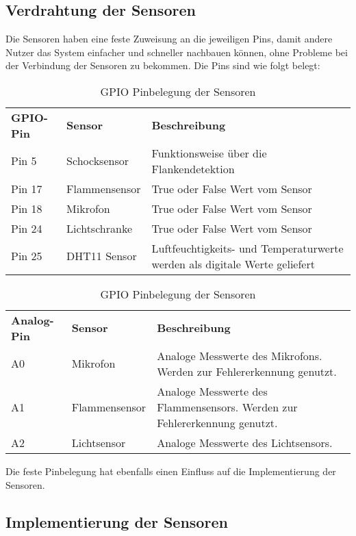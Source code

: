 \subsection{Verdrahtung der Sensoren}
Die Sensoren haben eine feste Zuweisung an die jeweiligen Pins, damit andere Nutzer das System einfacher und schneller nachbauen können, ohne Probleme bei der Verbindung der Sensoren zu bekommen. Die Pins sind wie folgt belegt:
\begin{table}[h]
	\caption{GPIO Pinbelegung der Sensoren}
	\label{tab:GPIO-Pinbelegung}
	\begin{tabular}{p{} p{} p{}}
		\textbf{GPIO-Pin}	& \textbf{Sensor} & \textbf{Beschreibung} \\
		Pin 5 		& Schocksensor 	& Funktionsweise über die Flankendetektion\\	
		Pin 17		& Flammensensor	& True oder False Wert vom Sensor\\
		Pin 18		& Mikrofon		& True oder False Wert vom Sensor\\
		Pin 24		& Lichtschranke	& True oder False Wert vom Sensor\\
		Pin 25		& DHT11 Sensor	& Luftfeuchtigkeits- und Temperaturwerte werden als digitale Werte geliefert
	\end{tabular}
	\begin{tabular}{p{} p{} p{}}
		\textbf{Analog-Pin}	& \textbf{Sensor} & \textbf{Beschreibung} \\
		A0	& Mikrofon 		& Analoge Messwerte des Mikrofons. Werden zur Fehlererkennung genutzt. \\
		A1	& Flammensensor	& Analoge Messwerte des Flammensensors. Werden zur Fehlererkennung genutzt.\\
		A2	& Lichtsensor	& Analoge Messwerte des Lichtsensors.
	\end{tabular}
\end{table}

Die feste Pinbelegung hat ebenfalls einen Einfluss auf die Implementierung der Sensoren.
\subsection{Implementierung der Sensoren}
